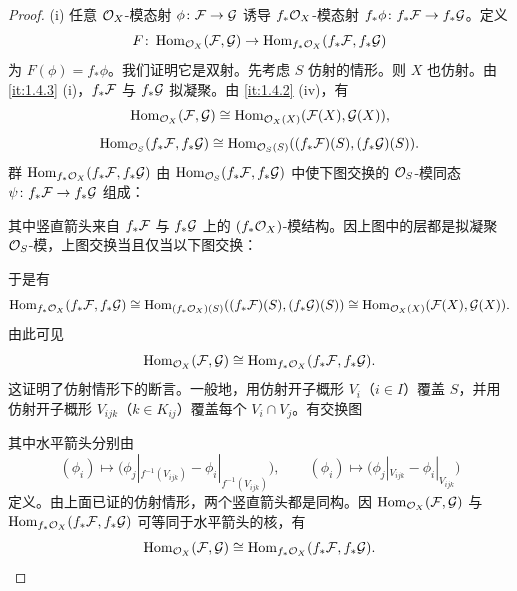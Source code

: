 \begin{proof}
(i) 任意 $\cO_X$-模态射 $\phi\colon\cF\to\cG$ 诱导 $f_*\cO_X$-模态射 $f_*\phi\colon f_*\cF\to f_*\cG$。定义
\[
F\colon\Hom_{\cO_X}(\cF,\cG)\to\Hom_{f_*\cO_X}(f_*\cF,f_*\cG)
\]
为 $F(\phi)=f_*\phi$。我们证明它是双射。先考虑 $S$ 仿射的情形。则 $X$ 也仿射。由 \ref{it:1.4.3} (i)，$f_*\cF$ 与 $f_*\cG$ 拟凝聚。由 \ref{it:1.4.2} (iv)，有
\[
\Hom_{\cO_X}(\cF,\cG)\cong\Hom_{\cO_X(X)}(\cF(X),\cG(X)),
\]
\[
\Hom_{\cO_S}(f_*\cF,f_*\cG)\cong\Hom_{\cO_S(S)}((f_*\cF)(S),(f_*\cG)(S)).
\]
群 $\Hom_{f_*\cO_X}(f_*\cF,f_*\cG)$ 由 $\Hom_{\cO_S}(f_*\cF,f_*\cG)$ 中使下图交换的 $\cO_S$-模同态 $\psi\colon f_*\cF\to f_*\cG$ 组成：
\begin{center}
\end{center}
其中竖直箭头来自 $f_*\cF$ 与 $f_*\cG$ 上的 $(f_*\cO_X)$-模结构。因上图中的层都是拟凝聚 $\cO_S$-模，上图交换当且仅当以下图交换：
\begin{center}
\end{center}
于是有
\[
\Hom_{f_*\cO_X}(f_*\cF,f_*\cG)\cong\Hom_{(f_*\cO_X)(S)}((f_*\cF)(S),(f_*\cG)(S))\cong\Hom_{\cO_X(X)}(\cF(X),\cG(X)).
\]
由此可见
\[
\Hom_{\cO_X}(\cF,\cG)\cong\Hom_{f_*\cO_X}(f_*\cF,f_*\cG).
\]
这证明了仿射情形下的断言。一般地，用仿射开子概形 $V_i$（$i\in I$）覆盖 $S$，并用仿射开子概形 $V_{ijk}$（$k\in K_{ij}$）覆盖每个 $V_i\cap V_j$。有交换图
\begin{center}\small
{}
\end{center}
其中水平箭头分别由
\[
(\phi_i)\mapsto\bigl(\phi_j|_{f^{-1}(V_{ijk})}-\phi_i|_{f^{-1}(V_{ijk})}\bigr),\qquad
(\phi_i)\mapsto\bigl(\phi_j|_{V_{ijk}}-\phi_i|_{V_{ijk}}\bigr)
\]
定义。由上面已证的仿射情形，两个竖直箭头都是同构。因 $\Hom_{\cO_X}(\cF,\cG)$ 与 $\Hom_{f_*\cO_X}(f_*\cF,f_*\cG)$ 可等同于水平箭头的核，有
\[
\Hom_{\cO_X}(\cF,\cG)\cong\Hom_{f_*\cO_X}(f_*\cF,f_*\cG).
\]


\end{proof}

